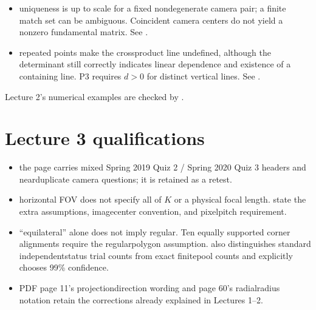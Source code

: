 \documentclass[letterpaper,11pt,english,openany,oneside]{jupyterBook}
\begin{document}
\begin{itemize}
\item {}
\sphinxAtStartPar
{} uniqueness is up to scale for a fixed nondegenerate camera pair; a finite match set can be ambiguous. Coincident camera centers do not yield a nonzero fundamental matrix. See {\hyperref[\detokenize{lectures/lecture02/two-view:lec02-two-view}]{}}.

\item {}
\sphinxAtStartPar
{} repeated points make the cross\sphinxhyphen{}product line undefined, although the determinant still correctly indicates linear dependence and existence of a containing line. P3 requires \(d>0\) for distinct vertical lines. See {\hyperref[\detokenize{lectures/lecture01/quiz-practice:lec01-quiz-practice}]{}}.

\end{itemize}

\sphinxAtStartPar
Lecture 2’s numerical examples are checked by .


\section{Lecture 3 qualifications}
\label{\detokenize{reference/errata:lecture-3-qualifications}}\begin{itemize}
\item {}
\sphinxAtStartPar
{} the page carries mixed Spring 2019 Quiz 2 / Spring 2020 Quiz 3 headers and near\sphinxhyphen{}duplicate camera questions; it is retained as a retest.

\item {}
\sphinxAtStartPar
{} horizontal FOV does not specify all of \(K\) or a physical focal length. {\hyperref[\detokenize{lectures/lecture03/calibration::doc}]{}} state the extra assumptions, image\sphinxhyphen{}center convention, and pixel\sphinxhyphen{}pitch requirement.

\item {}
\sphinxAtStartPar
{} “equilateral” alone does not imply regular. Ten equally supported corner alignments require the regular\sphinxhyphen{}polygon assumption. {\hyperref[\detokenize{lectures/lecture03/probability-ransac::doc}]{}} also distinguishes standard independent\sphinxhyphen{}status trial counts from exact finite\sphinxhyphen{}pool counts and explicitly chooses 99\% confidence.

\item {}
\sphinxAtStartPar
{} PDF page 11’s projection\sphinxhyphen{}direction wording and page 60’s radial\sphinxhyphen{}radius notation retain the corrections already explained in Lectures 1–2.

\end{itemize}
\end{document}
